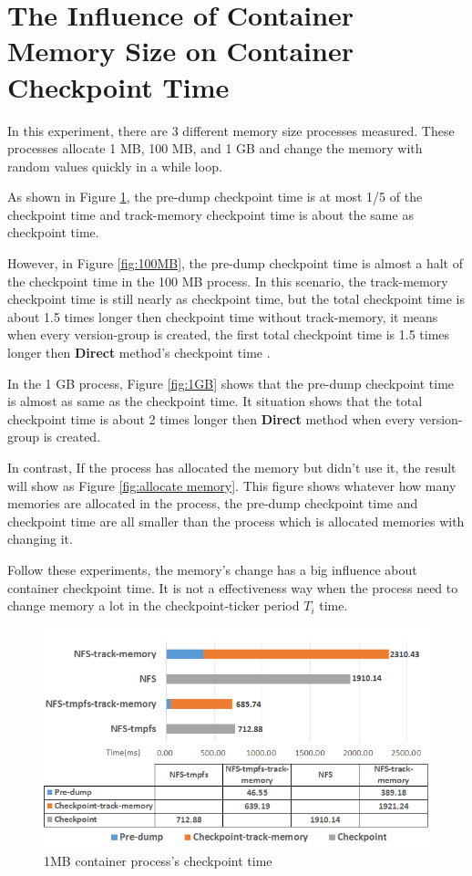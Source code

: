\section{The Influence of Container Memory Size on Container Checkpoint Time}
\label{sec:Memory Size}
In this experiment, there are 3 different memory size processes measured. These processes allocate 1 MB, 100 MB, and 1 GB and change the memory with random values quickly in a while loop.

As shown in Figure \ref{fig:1MB}, the pre-dump checkpoint time is at most 1/5 of the checkpoint time and track-memory checkpoint time is about the same as checkpoint time.

However, in Figure \ref{fig:100MB}, the pre-dump checkpoint time is almost a halt of the checkpoint time in the 100 MB process.
In this scenario, the track-memory checkpoint time is still nearly as checkpoint time, but the total checkpoint time is about 1.5 times longer then checkpoint time without track-memory, it means when every version-group is created, the first total checkpoint time is 1.5 times longer then \textbf{Direct} method's checkpoint time .

In the 1 GB process, Figure \ref{fig:1GB} shows that the pre-dump checkpoint time is almost as same as the checkpoint time. It situation shows that the total checkpoint time is about 2 times longer then \textbf{Direct} method when every version-group is created.

In contrast, If the process has allocated the memory but didn't use it, the result will show as Figure \ref{fig:allocate memory}. This figure shows whatever how many memories are allocated in the process, the pre-dump checkpoint time and checkpoint time are all smaller than the process which is allocated memories with changing it.

Follow these experiments, the memory's change has a big influence about container checkpoint time. It is not a effectiveness way when the process need to change memory a lot in the checkpoint-ticker period $ T_i $ time.

\begin{figure}[htbp]
\begin{center}
\includegraphics[width=14cm]{figure/1MB.png}
\end{center}
\caption{1MB container process's checkpoint time}
\label{fig:1MB}
\end{figure}


